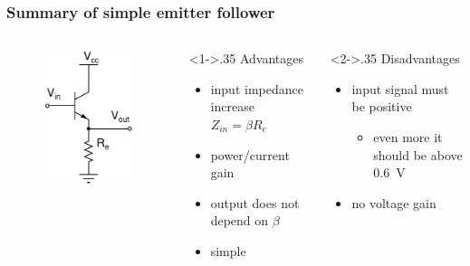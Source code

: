 \documentclass[beamer]{standalone}
\begin{document}
\frame
{ \frametitle{Summary of simple emitter follower}
\begin{columns}[c]
 \begin{column}{.3\textwidth}
  \begin{figure}
   \includegraphics[height=0.60\textheight]{./schematics/npn_emitter_follower}
  \end{figure}
 \end{column}
 \begin{column}<1->{.35\textwidth}
  Advantages
  \begin{itemize}
   \item input impedance increase $Z_{in}=\beta R_e$
   \item power/current gain
   \item output does not depend on $\beta$
   \item simple
  \end{itemize}

 \end{column}
 \begin{column}<2->{.35\textwidth}
  Disadvantages
  \begin{itemize}
   \item input signal must be positive
    \begin{itemize}
     \item even more it should be above 0.6~V
    \end{itemize}
   \item \alert{no voltage gain}
  \end{itemize}
 \end{column}
\end{columns}
 }
 
\end{document}
